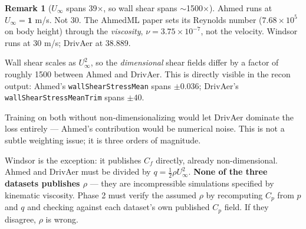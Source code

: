 \documentclass[10pt,a4paper]{article}
\theoremstyle{definition}
\newtheorem{remark}{Remark}[section]
\newcommand{\Cp}{{C_p}}
\newcommand{\Cf}{{C_f}}
\begin{document}
\begin{remark}[$U_\infty$ spans 39$\times$, so wall shear spans $\sim$1500$\times$]
\label{rem:velocity}
Ahmed runs at $U_\infty = \mathbf{1}$ m/s. Not 30. The AhmedML paper sets its Reynolds
number ($7.68\times10^5$ on body height) through the \emph{viscosity},
$\nu = 3.75\times10^{-7}$, not the velocity. Windsor runs at 30 m/s; DrivAer at 38.889.

Wall shear scales as $U_\infty^2$, so the \emph{dimensional} shear fields differ by a
factor of roughly 1500 between Ahmed and DrivAer. This is directly visible in the recon
output: Ahmed's \texttt{wallShearStressMean} spans $\pm0.036$; DrivAer's
\texttt{wallShearStressMeanTrim} spans $\pm40$.

Training on both without non-dimensionalizing would let DrivAer dominate the loss
entirely --- Ahmed's contribution would be numerical noise. This is not a subtle
weighting issue; it is three orders of magnitude.

Windsor is the exception: it publishes $\Cf$ directly, already non-dimensional. Ahmed and
DrivAer must be divided by $q = \tfrac{1}{2}\rho U_\infty^2$. \textbf{None of the three
datasets publishes $\rho$} --- they are incompressible simulations specified by kinematic
viscosity. Phase 2 must verify the assumed $\rho$ by recomputing $\Cp$ from $p$ and $q$
and checking against each dataset's own published $\Cp$ field. If they disagree, $\rho$
is wrong.
\end{remark}
\end{document}
